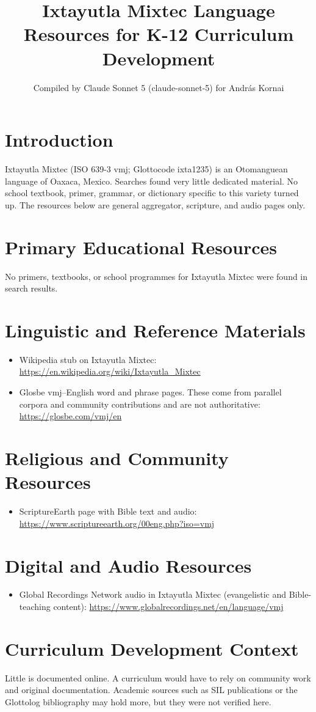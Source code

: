 \documentclass[12pt]{article}
\title{Ixtayutla Mixtec Language Resources for K-12 Curriculum Development}
\author{Compiled by Claude Sonnet 5 (claude-sonnet-5) for Andr\'as Kornai}
\date{}
\begin{document}
\maketitle

\section{Introduction}
Ixtayutla Mixtec (ISO 639-3 vmj; Glottocode ixta1235) is an Otomanguean language of Oaxaca, Mexico. Searches found very little dedicated material. No school textbook, primer, grammar, or dictionary specific to this variety turned up. The resources below are general aggregator, scripture, and audio pages only.

\section{Primary Educational Resources}
No primers, textbooks, or school programmes for Ixtayutla Mixtec were found in search results.

\section{Linguistic and Reference Materials}
\begin{itemize}
\item Wikipedia stub on Ixtayutla Mixtec: \url{https://en.wikipedia.org/wiki/Ixtayutla_Mixtec}
\item Glosbe vmj--English word and phrase pages. These come from parallel corpora and community contributions and are not authoritative: \url{https://glosbe.com/vmj/en}
\end{itemize}

\section{Religious and Community Resources}
\begin{itemize}
\item ScriptureEarth page with Bible text and audio: \url{https://www.scriptureearth.org/00eng.php?iso=vmj}
\end{itemize}

\section{Digital and Audio Resources}
\begin{itemize}
\item Global Recordings Network audio in Ixtayutla Mixtec (evangelistic and Bible-teaching content): \url{https://www.globalrecordings.net/en/language/vmj}
\end{itemize}

\section{Curriculum Development Context}
Little is documented online. A curriculum would have to rely on community work and original documentation. Academic sources such as SIL publications or the Glottolog bibliography may hold more, but they were not verified here.
\end{document}

